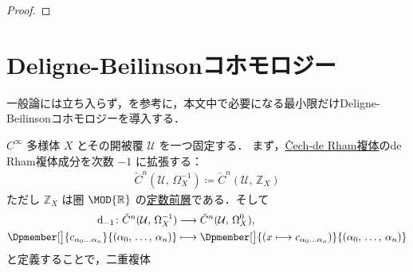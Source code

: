\documentclass[TQFT_main]{subfiles}
\begin{document}
\begin{proof}
    
\end{proof}


\section{Deligne-Beilinsonコホモロジー}

一般論には立ち入らず，\cite[p.21, Appendix A]{Bauer2005DB}を参考に，本文中で必要になる最小限だけDeligne-Beilinsonコホモロジーを導入する．

$C^\infty$ 多様体 $X$ とその開被覆 $\mathcal{U}$ を一つ固定する．
まず，\hyperref[ex:Cech-deRham]{\v{C}ech-de Rham複体}のde Rham複体成分を次数 $-1$ に拡張する：
\begin{align}
    \label{def:Cech-complex-1}
    \check{C}^{n} (\mathcal{U},\, \Omega^{-1}_X) \coloneqq \check{C}^n (\mathcal{U},\, \mathbb{Z}_X)
\end{align}
ただし $\mathbb{Z}_X$ は圏 $\MOD{\mathbb{R}}$ の\hyperref[ex:constant-presheaf]{定数前層}である．そして
\begin{align}
    \dd_{-1} \colon \check{C}^{n} (\mathcal{U},\, \Omega^{-1}_X) &\lto \check{C}^{n} (\mathcal{U},\, \Omega^{0}_X), \\
    \Dpmember[\big]{c_{\alpha_0 \dots \alpha_n}}{(\alpha_0,\, \dots ,\, \alpha_n)} &\lmto \Dpmember[\big]{(x \lmto c_{\alpha_0 \dots \alpha_n})}{(\alpha_0,\, \dots ,\, \alpha_n)}
\end{align}
と定義することで，二重複体
\begin{center}
\end{center}
\end{document}
